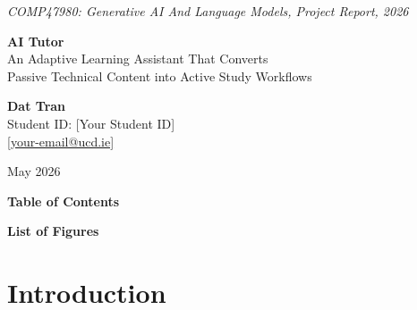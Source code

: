 \documentclass[12pt,a4paper]{article}
\begin{document}
\begin{titlepage}
  \centering
  \vspace*{1cm}
  {\small\textit{COMP47980: Generative AI And Language Models, Project Report, 2026}}
  \vspace{2cm}

  {\fontsize{32}{40}\selectfont\bfseries AI Tutor}\\[0.6em]
  {\Large An Adaptive Learning Assistant That Converts\\[0.3em]
   Passive Technical Content into Active Study Workflows}

  \vspace{2.5cm}

  {\large\bfseries Dat Tran}\\[0.3em]
  {\normalsize Student ID: [Your Student ID]}\\[0.5em]
  {\normalsize \href{mailto:dattran@example.com}{[your-email@ucd.ie]}}

  \vspace{2.5cm}

  \begin{center}
  \end{center}

  \vfill
  {\normalsize May 2026}
\end{titlepage}

\newpage
\setcounter{page}{2}
\thispagestyle{plain}
{\large\bfseries Table of Contents}
\vspace{0.5em}
\tableofcontents

\newpage
\thispagestyle{plain}
{\large\bfseries List of Figures}
\vspace{0.5em}
\listoffigures

\newpage
\setcounter{page}{1}

\section{Introduction}
\end{document}
